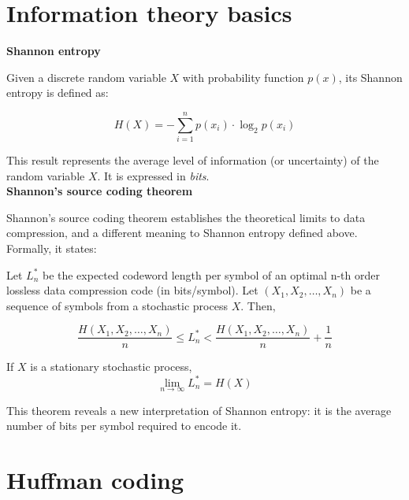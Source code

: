 \section{Information theory basics}
{\large\textbf{Shannon entropy}}

Given a discrete random variable $X$ with probability function $p(x)$, its Shannon entropy is defined as:

\begin{equation}
H(X) = - \sum_{i=1}^{n} p(x_i) \cdot \log_2 p(x_i) 
\end{equation}

This result represents the average level of information (or uncertainty) of the random variable $X$. It is expressed in \textit{bits}.\\


{\large\textbf{Shannon's source coding theorem}}

Shannon's source coding theorem establishes the theoretical limits to data compression, and a different meaning to Shannon entropy defined above. Formally, it states:

\begin{theorem}
Let $L_n^*$ be the expected codeword length per symbol of an optimal n-th order lossless data compression code (in bits/symbol). Let $(X_1, X_2, \dots, X_n )$ be a sequence of symbols from a stochastic process $X$. Then,

\begin{equation}
	\frac{H(X_1, X_2, \dots, X_n )}{n} \leq L_n^* < \frac{H(X_1, X_2, \dots, X_n )}{n} + \frac{1}{n}
\end{equation}

If $X$ is a stationary stochastic process,
\begin{equation}
	\lim_{n \to \infty} L_n^* = H(X)
\end{equation}
\end{theorem}

This theorem reveals a new interpretation of Shannon entropy: it is the average number of bits per symbol required to encode it.

\section{Huffman coding}

